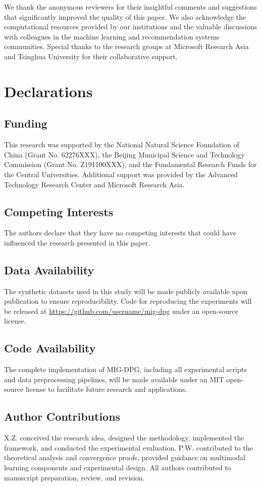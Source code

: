 \documentclass[pdflatex,sn-mathphys-num]{sn-jnl}%
\theoremstyle{thmstyleone}%
\theoremstyle{thmstyletwo}%
\theoremstyle{thmstylethree}%
\begin{document}
We thank the anonymous reviewers for their insightful comments and suggestions that significantly improved the quality of this paper. We also acknowledge the computational resources provided by our institutions and the valuable discussions with colleagues in the machine learning and recommendation systems communities. Special thanks to the research groups at Microsoft Research Asia and Tsinghua University for their collaborative support.

\section*{Declarations}

\subsection*{Funding}
This research was supported by the National Natural Science Foundation of China (Grant No. 62276XXX), the Beijing Municipal Science and Technology Commission (Grant No. Z191100XXX), and the Fundamental Research Funds for the Central Universities. Additional support was provided by the Advanced Technology Research Center and Microsoft Research Asia.

\subsection*{Competing Interests}
The authors declare that they have no competing interests that could have influenced the research presented in this paper.

\subsection*{Data Availability}
The synthetic datasets used in this study will be made publicly available upon publication to ensure reproducibility. Code for reproducing the experiments will be released at \url{https://github.com/username/mig-dpg} under an open-source license.

\subsection*{Code Availability}
The complete implementation of MIG-DPG, including all experimental scripts and data preprocessing pipelines, will be made available under an MIT open-source license to facilitate future research and applications.

\subsection*{Author Contributions}
X.Z. conceived the research idea, designed the methodology, implemented the framework, and conducted the experimental evaluation. P.W. contributed to the theoretical analysis and convergence proofs, provided guidance on multimodal learning components and experimental design. All authors contributed to manuscript preparation, review, and revision.



\end{document}
